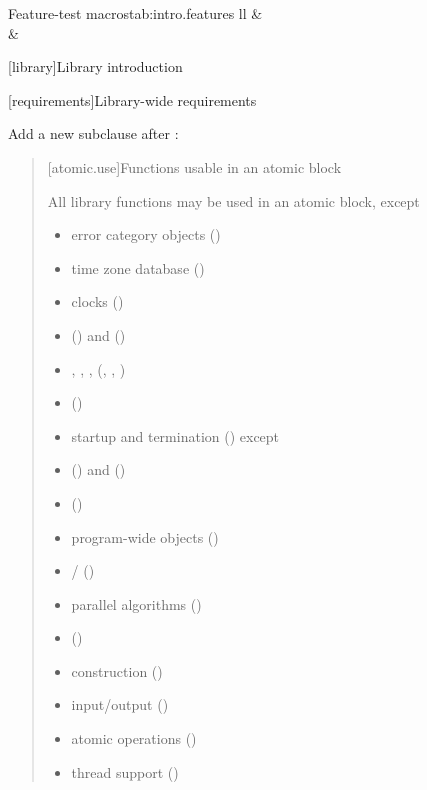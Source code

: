 \setcounter{table}{18}

\begin{floattable}{Feature-test macros}{tab:intro.features}
{ll}
\topline
{} &  \\
\capsep
{}  & \tcode{\tsver} \\
\end{floattable}


[library]{Library introduction}

\setcounter{section}{3}

[requirements]{Library-wide requirements}

\setcounter{subsection}{6}
\setcounter{subsubsection}{16}

Add a new subclause after :

\begin{quote}
[atomic.use]{Functions usable in an atomic block}

\pnum
All library functions may be used in an atomic block, except

\begin{itemize}
\item
  error category objects ()
\item
  time zone database ()
\item
  clocks ()
\item
   () and 
  ()
\item
  , ,
  , 
  (, , )
\item
   ()
\item
  startup and termination () except
\item
   () and
   ()
\item
   ()
\item
  program-wide  objects
  ()
\item
   /  ()
\item
  parallel algorithms ()
\item
   ()
\item
   construction ()
\item
  input/output ()
\item
  atomic operations ()
\item
  thread support ()
\end{itemize}
\end{quote}
